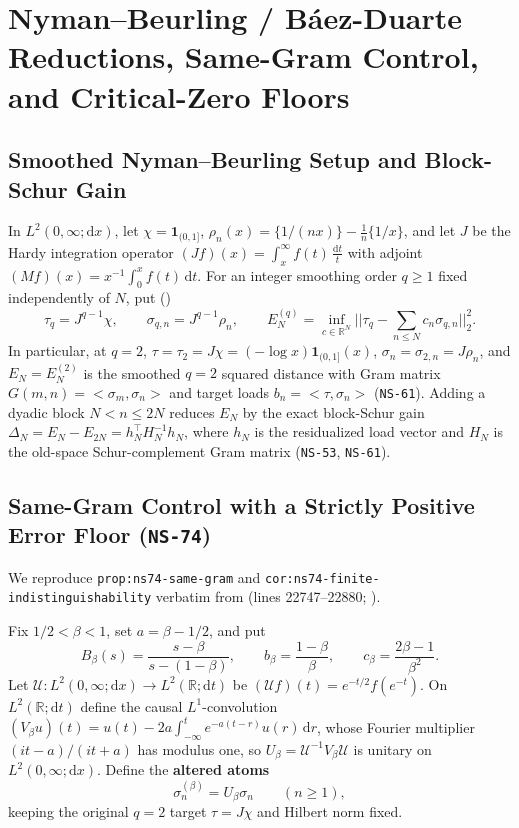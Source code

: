 \documentclass[11pt]{article}
\def\norm#1{||#1||}%
\def\ip#1#2{<#1,#2>}%
\theoremstyle{remark}
\newcommand{\norm}[1]{\left\lVert #1\right\rVert}
\newcommand{\ip}[2]{\left\langle #1,#2\right\rangle}
\newcommand{\dd}{\mathrm d}
\begin{document}
\section{Nyman--Beurling / B\'aez-Duarte Reductions, Same-Gram Control, and Critical-Zero Floors}
\label{sec:nb}

\subsection{Smoothed Nyman--Beurling Setup and Block-Schur Gain}
In $L^2(0,\infty;\dd x)$, let $\chi = \mathbf{1}_{(0,1]}$, $\rho_n(x) = \{1/(nx)\} - \frac{1}{n}\{1/x\}$, and let $J$ be the Hardy integration operator $(Jf)(x) = \int_x^\infty f(t)\,\frac{\dd t}{t}$ with adjoint $(Mf)(x) = x^{-1}\int_0^x f(t)\,\dd t$. For an integer smoothing order $q \ge 1$ fixed independently of $N$, put ()
\begin{equation}\label{eq:nb-smoothed-def}
  \tau_q = J^{q-1}\chi, \qquad \sigma_{q,n} = J^{q-1}\rho_n, \qquad E_N^{(q)} = \inf_{c \in \mathbb{R}^N} \norm{\tau_q - \sum_{n \le N} c_n \sigma_{q,n}}_2^2.
\end{equation}
In particular, at $q = 2$, $\tau = \tau_2 = J\chi = (-\log x)\mathbf{1}_{(0,1]}(x)$, $\sigma_n = \sigma_{2,n} = J\rho_n$, and $E_N = E_N^{(2)}$ is the smoothed $q = 2$ squared distance with Gram matrix $G(m,n) = \ip{\sigma_m}{\sigma_n}$ and target loads $b_n = \ip{\tau}{\sigma_n}$ (\texttt{NS-61}). Adding a dyadic block $N < n \le 2N$ reduces $E_N$ by the exact block-Schur gain $\Delta_N = E_N - E_{2N} = h_N^\top H_N^{-1} h_N$, where $h_N$ is the residualized load vector and $H_N$ is the old-space Schur-complement Gram matrix (\texttt{NS-53}, \texttt{NS-61}).

\subsection{Same-Gram Control with a Strictly Positive Error Floor (\texttt{NS-74})}
We reproduce \texttt{prop:ns74-same-gram} and \texttt{cor:ns74-finite-indistinguishability} verbatim from  (lines 22747--22880; ).

Fix $1/2 < \beta < 1$, set $a = \beta - 1/2$, and put
\begin{equation}\label{eq:ns74-params}
  B_\beta(s) = \frac{s - \beta}{s - (1 - \beta)}, \qquad b_\beta = \frac{1 - \beta}{\beta}, \qquad c_\beta = \frac{2\beta - 1}{\beta^2}.
\end{equation}
Let $\mathcal{U} : L^2(0,\infty;\dd x) \to L^2(\mathbb{R};\dd t)$ be $(\mathcal{U}f)(t) = e^{-t/2}f(e^{-t})$. On $L^2(\mathbb{R};\dd t)$ define the causal $L^1$-convolution $(V_\beta u)(t) = u(t) - 2a\int_{-\infty}^t e^{-a(t-r)}u(r)\,\dd r$, whose Fourier multiplier $(it-a)/(it+a)$ has modulus one, so $U_\beta = \mathcal{U}^{-1}V_\beta\mathcal{U}$ is unitary on $L^2(0,\infty;\dd x)$. Define the \textbf{altered atoms}
\begin{equation}\label{eq:ns74-altered-atoms}
  \sigma_n^{(\beta)} = U_\beta \sigma_n \qquad (n \ge 1),
\end{equation}
keeping the original $q = 2$ target $\tau = J\chi$ and Hilbert norm fixed.
\end{document}
